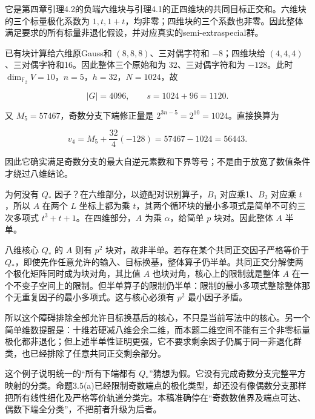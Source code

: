 \documentclass[UTF8,fontset=fandol,zihao=-4,openany,oneside]{ctexbook}
\begin{document}
它是第四章引理4.2的负端六维块与引理4.1的正四维块的共同目标正交和。六维块的三个标量极化系数为 \(1,t,1+t\)，均非零；四维块的三个系数也非零。因此整体满足要求的所有标量非退化假设，并对应真实的semi-extraspecial群。



已有块计算给六维原Gauss和 \((8,8,8)\)、三对偶字符和 \(-8\)；四维块给 \((4,4,4)\)、三对偶字符和16。因此整体三个原始和为 \(32\)、三对偶字符和为 \(-128\)。此时 \(\dim_{\mathbb F_2}V=10\)，\(n=5\)，\(h=32\)，\(N=1024\)，故



\[
|G|=4096,\qquad s=1024+96=1120.
\]



又 \(M_5=57467\)，奇数分支下端修正量是 \(2^{3n-5}=2^{10}=1024\)。直接换算为



\[
v_4=M_5+\frac{32}{4}(-128)=57467-1024=56443.
\]



因此它确实满足奇数分支的最大自逆元素数和下界等号；不是由于放宽了数值条件才绕过八维结论。



为何没有 \(Q_*\) 因子？在六维部分，以迹配对识别算子，\(B_1\) 对应乘1、\(B_2\) 对应乘 \(t\)，所以 \(A\) 在两个 \(L\) 坐标上都为乘 \(t\)，其两个循环块的最小多项式是简单不可约三次多项式 \(t^3+t+1\)。在四维部分，\(A\) 为乘 \(\alpha\)，给简单 \(p\) 块对。因此整体 \(A\) 半单。



八维核心 \(Q_*\) 的 \(A\) 则有 \(p^2\) 块对，故非半单。若存在某个共同正交因子严格等价于 \(Q_*\)，即使先作任意允许的输入、目标换基，整体算子仍半单。共同正交分解使两个极化矩阵同时成为块对角，其比值 \(A\) 也块对角，核心上的限制就是整体 \(A\) 在一个不变子空间上的限制。但半单算子的限制仍半单：限制的最小多项式整除整体那个无重复因子的最小多项式。这与核心必须有 \(p^2\) 最小因子矛盾。



所以这个障碍排除全部允许目标换基后的核心，不只是当前写法中的核心。另一个简单维数提醒是：十维若硬减八维会余二维，而本题二维空间不能有三个非零标量极化都非退化；但上述半单性证明更强，它不要求剩余因子仍属于同一非退化群类，也已经排除了任意共同正交剩余部分。



这个例子说明统一的“所有下端都有 \(Q_*\)”猜想为假。它没有完成奇数分支完整平方映射的分类。命题3.5(a)已经限制奇数端点的极化类型，却还没有像偶数分支那样把所有线性细化及严格等价轨道分类完。本稿准确停在“奇数数值界及端点可达、偶数下端全分类”，不把前者升级为后者。
\end{document}
